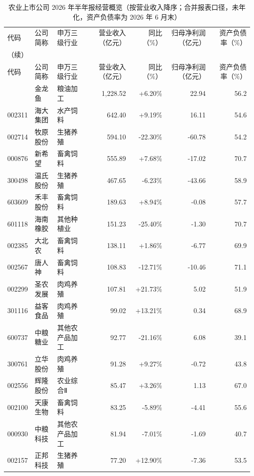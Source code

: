 \begingroup\scriptsize\setlength{\tabcolsep}{2pt}
\begin{longtable}{@{}llp{2.4cm}rrrr@{}}
\caption{农业上市公司 2026 年半年报经营概览（按营业收入降序；合并报表口径，未年化，资产负债率为 2026 年 6 月末）}\label{tab:company-h1}\\\\
\toprule
代码 & 公司简称 & 申万三级行业 & 营业收入（亿元） & 同比（\%） & 归母净利润（亿元） & 资产负债率（\%） \\
\midrule
\endfirsthead
\multicolumn{7}{l}{\small（续）}\\
\toprule
代码 & 公司简称 & 申万三级行业 & 营业收入（亿元） & 同比（\%） & 归母净利润（亿元） & 资产负债率（\%） \\
\midrule
\endhead
\bottomrule
\endlastfoot
300999 & 金龙鱼 & 粮油加工 & 1,228.52 & +6.20\% & 22.94 & 56.2 \\
002311 & 海大集团 & 水产饲料 & 642.40 & +9.19\% & 16.11 & 54.6 \\
002714 & 牧原股份 & 生猪养殖 & 594.10 & -22.30\% & -60.78 & 54.2 \\
000876 & 新希望 & 畜禽饲料 & 555.89 & +7.68\% & -17.02 & 70.7 \\
300498 & 温氏股份 & 生猪养殖 & 467.65 & -6.23\% & -43.66 & 58.9 \\
603609 & 禾丰股份 & 畜禽饲料 & 189.63 & +8.94\% & -0.08 & 57.7 \\
601118 & 海南橡胶 & 其他种植业 & 151.23 & -25.40\% & -1.30 & 70.7 \\
002385 & 大北农 & 畜禽饲料 & 138.11 & +1.86\% & -6.77 & 69.9 \\
002567 & 唐人神 & 畜禽饲料 & 108.83 & -12.71\% & -10.46 & 71.1 \\
002299 & 圣农发展 & 肉鸡养殖 & 107.81 & +21.73\% & 5.02 & 51.9 \\
301116 & 益客食品 & 肉鸡养殖 & 99.02 & +13.21\% & 0.34 & 68.9 \\
600737 & 中粮糖业 & 其他农产品加工 & 92.77 & -21.16\% & 6.08 & 39.1 \\
300761 & 立华股份 & 肉鸡养殖 & 91.28 & +9.27\% & -0.72 & 43.8 \\
002556 & 辉隆股份 & 农业综合Ⅱ & 85.47 & +3.26\% & 1.13 & 67.0 \\
002100 & 天康生物 & 畜禽饲料 & 83.25 & -5.89\% & -4.41 & 55.6 \\
000930 & 中粮科技 & 其他农产品加工 & 81.94 & -7.01\% & -1.69 & 40.7 \\
002157 & 正邦科技 & 生猪养殖 & 77.20 & +12.90\% & -7.36 & 53.5 \\

\end{longtable}
